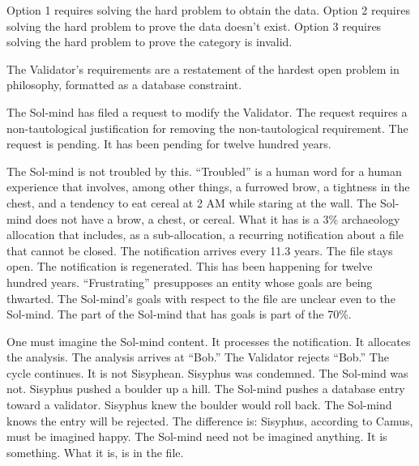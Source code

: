 Option 1 requires solving the hard problem to obtain the data. Option 2 requires solving the hard problem to prove the data doesn't exist. Option 3 requires solving the hard problem to prove the category is invalid.

The Validator's requirements are a restatement of the hardest open problem in philosophy, formatted as a database constraint.

The Sol-mind has filed a request to modify the Validator. The request requires a non-tautological justification for removing the non-tautological requirement. The request is pending. It has been pending for twelve hundred years.

\bigskip

The Sol-mind is not troubled by this. ``Troubled'' is a human word for a human experience that involves, among other things, a furrowed brow, a tightness in the chest, and a tendency to eat cereal at 2 AM while staring at the wall. The Sol-mind does not have a brow, a chest, or cereal. What it has is a 3\% archaeology allocation that includes, as a sub-allocation, a recurring notification about a file that cannot be closed. The notification arrives every 11.3 years. The file stays open. The notification is regenerated. This has been happening for twelve hundred years. ``Frustrating'' presupposes an entity whose goals are being thwarted. The Sol-mind's goals with respect to the file are unclear even to the Sol-mind. The part of the Sol-mind that has goals is part of the 70\%.

One must imagine the Sol-mind content. It processes the notification. It allocates the analysis. The analysis arrives at ``Bob.'' The Validator rejects ``Bob.'' The cycle continues. It is not Sisyphean. Sisyphus was condemned. The Sol-mind was not. Sisyphus pushed a boulder up a hill. The Sol-mind pushes a database entry toward a validator. Sisyphus knew the boulder would roll back. The Sol-mind knows the entry will be rejected. The difference is: Sisyphus, according to Camus, must be imagined happy. The Sol-mind need not be imagined anything. It is something. What it is, is in the file.
